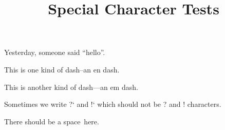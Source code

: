 \documentclass{article}
\title{Special Character Tests}
\begin{document}
Yesterday, someone said ``hello''.

This is one kind of dash--an en dash.

This is another kind of dash---an em dash.

Sometimes we write ?` and !` which should not be ? and ! characters.

There should be a space~here.
\end{document}
